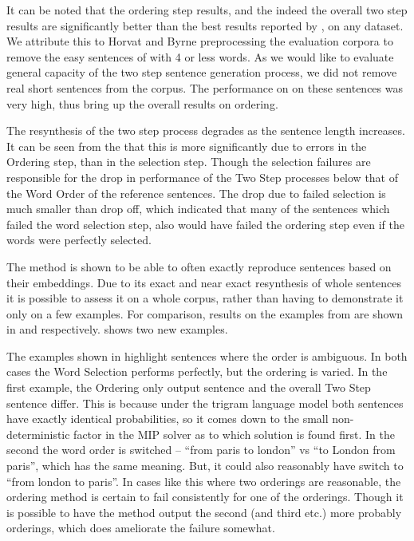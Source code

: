 \documentclass[11pt]{article}
\theoremstyle{plain}
\theoremstyle{definition}
\begin{document}
It can be noted that the ordering step results, and the indeed the overall two step results are significantly better than the best results reported by \textcite{Horvat2014}, on any dataset. We attribute this to Horvat and Byrne preprocessing the evaluation corpora to remove the easy sentences of with 4 or less words. As we would like to evaluate general capacity of the two step sentence generation process, we did not remove real short sentences from the corpus. The performance on on these sentences was very high, thus bring up the overall results on ordering.

The resynthesis of the two step process degrades as the sentence length increases. It can be seen from the \label{figure:exactlenscore} that this is more significantly due to errors in the Ordering step, than in the selection step. Though the selection failures are responsible for the drop in performance of the Two Step processes below that of the Word Order of the reference sentences. The drop due to failed selection is much smaller than drop off, which indicated that many of the sentences which failed the word selection step, also would have failed the ordering step even if the words were perfectly selected.



The method is shown to be able to often exactly reproduce sentences based on their embeddings.  Due to its exact and near exact resynthesis of whole sentences it is possible to assess it on a whole corpus, rather than having to demonstrate it only on a few examples. For comparison, results on the examples from \textcite{iyyer2014generating,Bowman2015SmoothGeneration} are shown in  and  respectively.  shows two new examples.

The examples shown in  highlight sentences where the order is ambiguous. In both cases the Word Selection performs perfectly, but the ordering is varied. In the first example, the Ordering only output sentence and the overall Two Step sentence differ. This is because under the trigram language model both sentences have exactly identical probabilities, so it comes down to the small non-deterministic factor in the MIP solver as to which solution is found first. In the second the word order is switched -- ``from paris to london'' vs ``to London from paris'', which has the same meaning. But, it could also reasonably have switch to ``from london to paris''. In cases like this where two orderings are reasonable, the ordering method is certain to fail consistently for one of the orderings. Though it is possible to have the method output the second (and third etc.) more probably orderings, which does ameliorate the failure somewhat.
\end{document}
